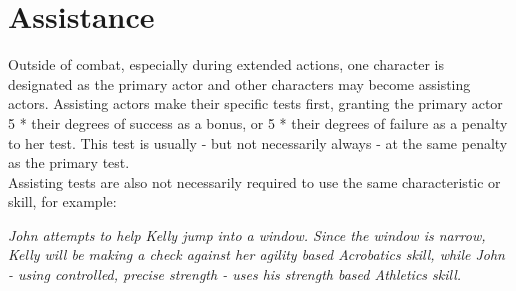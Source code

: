 \documentclass[12pt,a4paper,openany,usenames,dvipsnames]{book}
\begin{document}
	\section{Assistance}
	Outside of combat, especially during extended actions,
		one character is designated as the primary actor and other characters may become assisting actors.
	Assisting actors make their specific tests first,
		granting the primary actor 5 * their degrees of success as a bonus,
		or 5 * their degrees of failure as a penalty to her test.
	This test is usually - but not necessarily always - at the same penalty as the primary test.
	\\%
	Assisting tests are also not necessarily required to use the same characteristic or skill, for example:\par
	\begin{exampleblock}
		\itshape
		John attempts to help Kelly jump into a window. Since the window is narrow, Kelly will be making a check against her agility based Acrobatics skill, while John - using controlled, precise strength - uses his strength based Athletics skill.
	\end{exampleblock}
\end{document}
